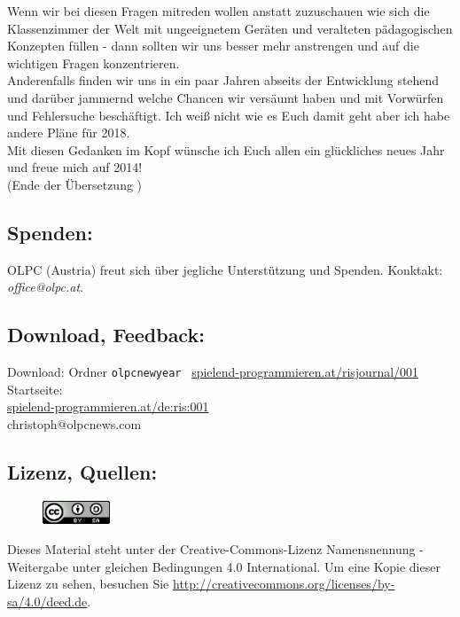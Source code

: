 \documentclass[10pt,a4paper,ngerman,twoside]{article} %
\begin{document}
\begin{multicols}{3}
Wenn wir bei diesen Fragen mitreden wollen anstatt zuzuschauen wie sich die Klassenzimmer der Welt mit ungeeignetem Geräten und veralteten pädagogischen Konzepten füllen - dann sollten wir uns besser mehr anstrengen und auf die wichtigen Fragen konzentrieren. \\

Anderenfalls finden wir uns in ein paar Jahren abseits der Entwicklung stehend und darüber jammernd welche Chancen wir versäumt haben und mit Vorwürfen und Fehlersuche beschäftigt. Ich weiß nicht wie es Euch damit geht aber ich habe andere Pläne für 2018. \\

Mit diesen Gedanken im Kopf wünsche ich Euch allen ein glückliches neues Jahr und freue mich auf 2014! \\

(Ende der Übersetzung )


\subsection*{Spenden:}

OLPC (Austria) freut sich über jegliche Unterstützung und Spenden. Konktakt: \textit{office@olpc.at}. \\

\subsection*{Download, Feedback:}
\footnotesize{
Download: Ordner \texttt{olpcnewyear} \Mundus\ \href{http://spielend-programmieren.at/risjournal/001}{spielend-programmieren.at/risjournal/001}\\
Startseite:\\
\href{http://spielend-programmieren.at/de:ris:001}{spielend-programmieren.at/de:ris:001}\\ 
\Letter\:  christoph@olpcnews.com \\}
\normalsize
 

\subsection*{Lizenz, Quellen:}
\begin{figure}
\includegraphics[width=2cm]{olpcnewyear/ccbysa88x31.png}
\end{figure}
Dieses Material steht unter der Creative-Commons-Lizenz Namensnennung - Weitergabe unter gleichen Bedingungen 4.0 International. Um eine Kopie dieser Lizenz zu sehen, besuchen Sie \url{http://creativecommons.org/licenses/by-sa/4.0/deed.de}.


\end{multicols}
\end{document}

